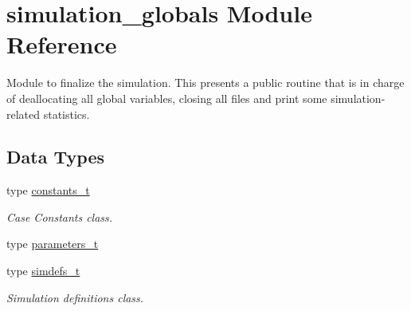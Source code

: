 \hypertarget{namespacesimulation__globals}{}\section{simulation\+\_\+globals Module Reference}
\label{namespacesimulation__globals}


Module to finalize the simulation. This presents a public routine that is in charge of deallocating all global variables, closing all files and print some simulation-\/related statistics.  


\subsection*{Data Types}
\begin{DoxyCompactItemize}
\item 
type \mbox{\hyperlink{structsimulation__globals_1_1constants__t}{constants\+\_\+t}}
\begin{DoxyCompactList}\small\item\em Case Constants class. \end{DoxyCompactList}\item 
type \mbox{\hyperlink{structsimulation__globals_1_1parameters__t}{parameters\+\_\+t}}
\item 
type \mbox{\hyperlink{structsimulation__globals_1_1simdefs__t}{simdefs\+\_\+t}}
\begin{DoxyCompactList}\small\item\em Simulation definitions class. \end{DoxyCompactList}\end{DoxyCompactItemize}
